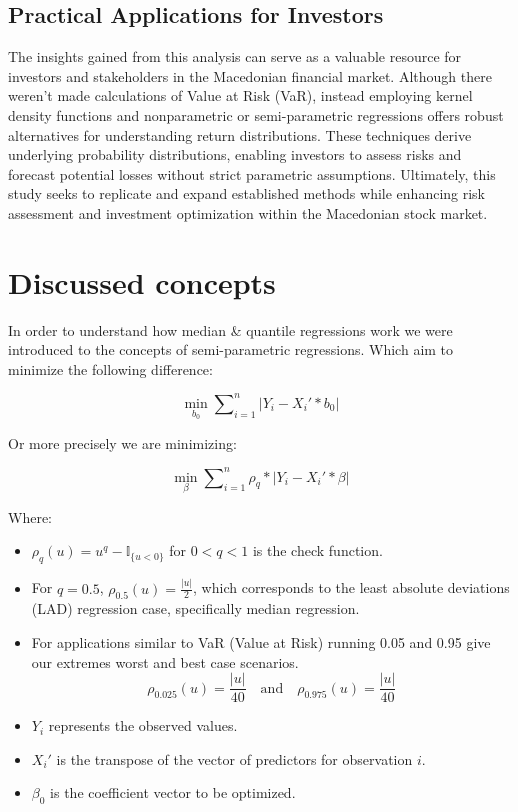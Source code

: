 \documentclass[]{article}
\begin{document}
	
	\subsection{Practical Applications for Investors}
	
	The insights gained from this analysis can serve as a valuable resource for investors and stakeholders in the Macedonian financial market. Although there weren't made calculations of Value at Risk (VaR), instead employing kernel density functions and nonparametric or semi-parametric regressions offers robust alternatives for understanding return distributions. These techniques derive underlying probability distributions, enabling investors to assess risks and forecast potential losses without strict parametric assumptions. Ultimately, this study seeks to replicate and expand established methods while enhancing risk assessment and investment optimization within the Macedonian stock market.
	
	\section{Discussed concepts}
	In order to understand how median \& quantile regressions work we were introduced to the concepts of semi-parametric regressions. Which aim to minimize the following difference:
	
	$$ \min_{b_0} \sum\nolimits_{i=1}^{n} | Y_i - X_i' * b_0 |  $$
	
	Or more precisely we are minimizing:
	
	$$ \min_{\beta} \sum\nolimits_{i=1}^{n} \rho_q * | Y_i - X_i' * \beta |  $$
	
	Where:
	\begin{itemize}
		 \item [] \(\rho_q(u) = u^{q} - \mathbb{I}_{\{u < 0\}}\) for \(0 < q < 1\) is the check function.
		\item [] For \(q = 0.5\), \(\rho_{0.5}(u) = \frac{|u|}{2}\), which corresponds to the least absolute deviations (LAD) regression case, specifically median regression.
		\item [] For applications similar to VaR (Value at Risk) running 0.05 and 0.95 give our extremes worst and best case scenarios.
		$$  \rho_{0.025}(u) = \frac{|u|}{40} \quad \text{and} \quad \rho_{0.975}(u) = \frac{|u|}{40} $$ 
		\item [] \(Y_i\) represents the observed values.
		\item [] \(X_i'\) is the transpose of the vector of predictors for observation \(i\).
		\item [] \(\beta_0\) is the coefficient vector to be optimized.
	\end{itemize}
	
\end{document}
